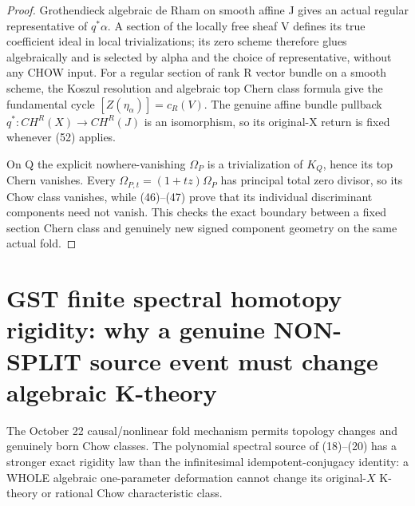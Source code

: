 \documentclass[11pt]{article}
\begin{document}
\begin{proof}
Grothendieck algebraic de Rham on
smooth affine J gives an actual
regular representative of $q^*\alpha$.
A section of the locally free sheaf
V defines its true coefficient ideal
in local trivializations; its zero
scheme therefore glues algebraically
and is selected by alpha and the
choice of representative, without
any CHOW input. For a regular section
of rank R vector bundle on a
smooth scheme, the Koszul resolution
and algebraic top Chern class formula
give the fundamental cycle
$[Z(\eta_\alpha)]=c_R(V)$.
The genuine affine bundle pullback
$q^*:CH^R(X)\to CH^R(J)$ is an
isomorphism, so its original-X return
is fixed whenever (52) applies.

On Q the explicit nowhere-vanishing
$\Omega_P$ is a trivialization of
$K_Q$, hence its top Chern vanishes.
Every $\Omega_{P,t}=(1+tz)\Omega_P$
has principal total zero divisor,
so its Chow class vanishes, while
(46)--(47) prove that its individual
discriminant components need not
vanish. This checks the exact boundary
between a fixed section Chern class
and genuinely new signed component
geometry on the same actual fold.
\end{proof}


\section{GST finite spectral homotopy rigidity: why a genuine NON-SPLIT source event must change algebraic K-theory}
The October 22 causal/nonlinear fold mechanism permits topology
changes and genuinely born Chow classes.
The polynomial spectral source of (18)--(20) has
a stronger exact rigidity law than the infinitesimal
idempotent-conjugacy identity: a WHOLE algebraic
one-parameter deformation cannot change its original-$X$
K-theory or rational Chow characteristic class.
\end{document}
